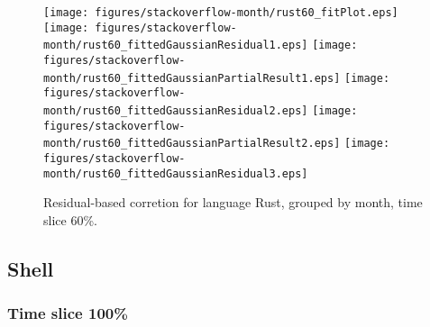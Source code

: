 \begin{figure}[t]
\centering
{}
{\texttt{[image: figures/stackoverflow-month/rust60\_fitPlot.eps]}}
{\texttt{[image: figures/stackoverflow-month/rust60\_fittedGaussianResidual1.eps]}}
{\texttt{[image: figures/stackoverflow-month/rust60\_fittedGaussianPartialResult1.eps]}}
{\texttt{[image: figures/stackoverflow-month/rust60\_fittedGaussianResidual2.eps]}}
{\texttt{[image: figures/stackoverflow-month/rust60\_fittedGaussianPartialResult2.eps]}}
{\texttt{[image: figures/stackoverflow-month/rust60\_fittedGaussianResidual3.eps]}}
\caption{Residual-based corretion for language Rust, grouped by month, time slice 60\%.}
\end{figure}


\FloatBarrier


\subsection{Shell}

\subsubsection{Time slice 100\%}

